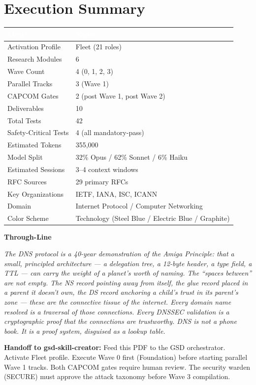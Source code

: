 \documentclass[11pt,letterpaper]{article}
\newcommand{\tableheader}[1]{\textbf{\sffamily\textcolor{white}{#1}}}
\begin{document}
\section{Execution Summary}

\begin{center}
\begin{tabularx}{\textwidth}{L{5cm}X}
\toprule
{}
\tableheader{Metric} & \tableheader{Value} \\
\midrule
Activation Profile & Fleet (21 roles) \\
Research Modules & 6 \\
Wave Count & 4 (0, 1, 2, 3) \\
Parallel Tracks & 3 (Wave 1) \\
CAPCOM Gates & 2 (post Wave 1, post Wave 2) \\
Deliverables & 10 \\
Total Tests & 42 \\
Safety-Critical Tests & 4 (all mandatory-pass) \\
Estimated Tokens & 355,000 \\
Model Split & 32\% Opus / 62\% Sonnet / 6\% Haiku \\
Estimated Sessions & 3--4 context windows \\
RFC Sources & 29 primary RFCs \\
Key Organizations & IETF, IANA, ISC, ICANN \\
Domain & Internet Protocol / Computer Networking \\
Color Scheme & Technology (Steel Blue / Electric Blue / Graphite) \\
\bottomrule
\end{tabularx}
\end{center}

\vspace{2em}

\begin{quotebox}
\textbf{\sffamily Through-Line}

\vspace{0.5em}
{\itshape The DNS protocol is a 40-year demonstration of the Amiga Principle: that a small, principled architecture --- a delegation tree, a 12-byte header, a type field, a TTL --- can carry the weight of a planet's worth of naming. The ``spaces between'' are not empty. The NS record pointing away from itself, the glue record placed in a parent it doesn't own, the DS record anchoring a child's trust in its parent's zone --- these are the connective tissue of the internet. Every domain name resolved is a traversal of those connections. Every DNSSEC validation is a cryptographic proof that the connections are trustworthy. DNS is not a phone book. It is a proof system, disguised as a lookup table.}

\vspace{0.8em}
\noindent\textbf{\sffamily Handoff to gsd-skill-creator:} Feed this PDF to the GSD orchestrator. Activate Fleet profile. Execute Wave 0 first (Foundation) before starting parallel Wave 1 tracks. Both CAPCOM gates require human review. The security warden (SECURE) must approve the attack taxonomy before Wave 3 compilation.
\end{quotebox}
\end{document}
